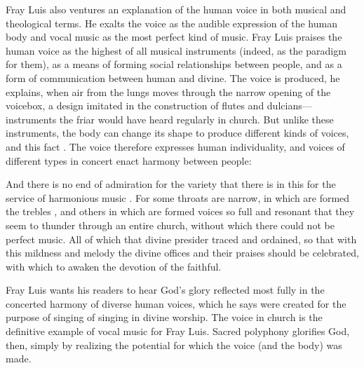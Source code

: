 Fray Luis also ventures an explanation of the human voice in both musical and
theological terms.
He exalts the voice as the audible expression of the human body and
vocal music as the most perfect kind of music.%
    \Autocite[243]{LuisdeGranada:Simbolo} 
Fray Luis praises the human voice as the highest of all musical instruments
(indeed, as the paradigm for them), as a means of forming social relationships
between people, and as a form of communication between human and divine.
The voice is produced, he explains, when air from the lungs moves through the
narrow opening of the voicebox, a design imitated in the construction of flutes
and dulcians---instruments the friar would have heard regularly in church.
But unlike these instruments, the body can change its shape to produce
different kinds of voices, and this fact .%
    \Autocite[252]{LuisdeGranada:Simbolo}
The voice therefore expresses human individuality, and voices of different
types in concert enact harmony between people: 
\begin{quoting} 
    And there is no end of admiration for the variety that there is in this for
    the service of harmonious music .  
    For some throats are narrow, in which are formed the trebles
    , and others in which are formed voices so full and
    resonant that they seem to thunder through an entire church, without which
    there could not be perfect music.
    All of which that divine presider traced and ordained, so that with this
    mildness and melody the divine offices and their praises should be
    celebrated, with which to awaken the devotion of the faithful.%
        \Autocite[252]{LuisdeGranada:Simbolo} 
\end{quoting}
Fray Luis wants his readers to hear God's glory reflected most fully in the
concerted harmony of diverse human voices, which he says were created for the
purpose of singing of singing in divine worship.
The voice in church is the definitive example of vocal music for Fray Luis.
Sacred polyphony glorifies God, then, simply by realizing the potential for
which the voice (and the body) was made.

